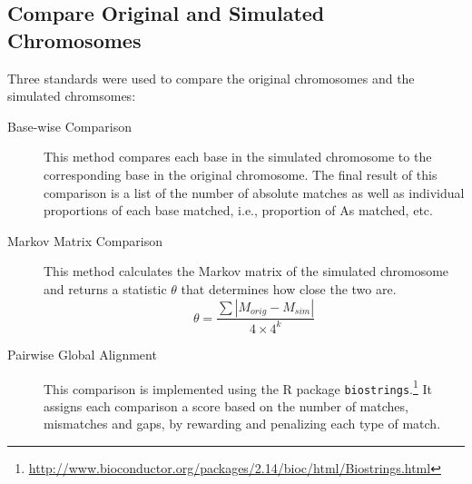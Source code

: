 \documentclass[12pt]{article}
\begin{document}
\subsection{Compare Original and Simulated Chromosomes}
Three standards were used to compare the original chromosomes and the simulated chromsomes:
\begin{description}
\item[Base-wise Comparison] This method compares each base in the simulated chromosome to the corresponding base in the original chromosome. The final result of this comparison is a list of the number of absolute matches as well as individual proportions of each base matched, i.e., proportion of As matched, etc.
\item[Markov Matrix Comparison] This method calculates the Markov matrix of the simulated chromosome and returns a statistic $\theta$ that determines how close the two are.
$$
\theta = \frac{\sum |M_{orig} - M_{sim}|}{4 \times 4^k}
$$
\item[Pairwise Global Alignment] This comparison is implemented using the R package \texttt{biostrings}.\footnote{\url{http://www.bioconductor.org/packages/2.14/bioc/html/Biostrings.html}} It assigns each comparison a score based on the number of matches, mismatches and gaps, by rewarding and penalizing each type of match.
\end{description}
\end{document}
